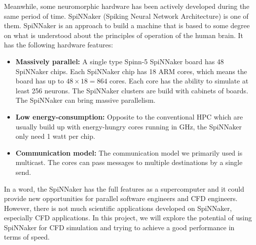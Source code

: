 Meanwhile, some neuromorphic hardware has been actively developed during the same period of time. SpiNNaker (Spiking Neural Network Architecture) is one of them. SpiNNaker  \cite{thespinnbible} is an approach to build a machine that is based to some degree on what is understood about the principles of operation of the human brain. It has the following hardware features:
\begin{itemize} 
\item \textbf{Massively parallel:} A single type Spinn-5 SpiNNaker board has 48 SpiNNaker chips. Each SpiNNaker chip has 18 ARM cores, which means the board has up to $48 \times 18 = 864$ cores. Each core has the ability to simulate at least 256 neurons. The SpiNNaker clusters are build with cabinets of boards. The SpiNNaker can bring massive parallelism.

\item \textbf{Low energy-consumption:} Opposite to the conventional HPC which are usually build up with energy-hungry cores running in GHz, the SpiNNaker only need 1 watt per chip.

\item \textbf{Communication model:} The communication model we primarily used is multicast. The cores can pass messages to multiple destinations by a single send.
\end{itemize}


In a word, the SpiNNaker has the full features as a supercomputer and it could provide new opportunities for parallel software engineers and CFD engineers. However, there is not much scientific applications developed on SpiNNaker, especially CFD applications. In this project, we will explore the potential of using SpiNNaker for CFD simulation and trying to achieve a good performance in terms of speed.\\
 

